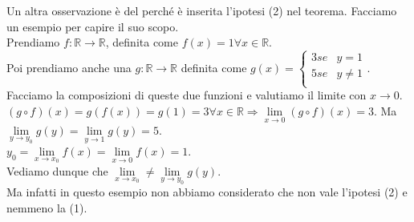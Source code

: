 \begin{observation}
    Un altra osservazione è del perché è inserita l'ipotesi (2) nel teorema. Facciamo un esempio per capire il suo scopo.\\
    Prendiamo $f: \mathbb{R} \to \mathbb{R}$, definita come $f(x) = 1 \forall x \in \mathbb{R}$.\\
    Poi prendiamo anche una $g: \mathbb{R} \to \mathbb{R}$ definita come $g(x) = \begin{cases}
        3 se & y = 1\\
        5 se & y \neq 1\\
    \end{cases}$. Facciamo la composizioni di queste due funzioni e valutiamo il limite con $x\to 0$.\\
    $(g \circ f)(x) = g(f(x)) = g(1) = 3 \forall x \in \mathbb{R} \Longrightarrow \lim\limits_{x\to 0}(g \circ f)(x) = 3$.
    Ma  $\lim\limits_{y \to y_0}g(y) = \lim\limits_{y\to 1}g(y) = 5$.\\
    $y_0 = \lim\limits_{x \to x_0}f(x) = \lim\limits_{x\to 0}f(x) = 1$.\\
    Vediamo dunque che $\lim\limits_{x\to x_0} \neq \lim\limits_{y \to y_0}g(y)$.\\
    Ma infatti in questo esempio non abbiamo considerato che non vale l'ipotesi (2) e nemmeno la (1).
\end{observation}

